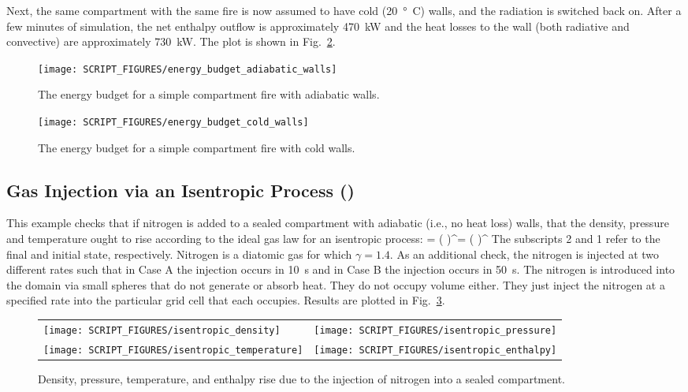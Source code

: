 \documentclass[11pt]{book}
\begin{document}
Next, the same compartment with the same fire is now assumed to have cold (20~\si{\degree C}) walls, and the radiation is switched back on. After a few minutes of simulation, the net enthalpy outflow is approximately 470~kW and the heat losses to the wall (both radiative and convective) are approximately 730~kW. The plot is shown in Fig.~\ref{energy_budget_cold_walls_fig}.

\begin{figure}[ht]
\centering
\texttt{[image: SCRIPT\_FIGURES/energy\_budget\_adiabatic\_walls]}
\caption[The {\ct energy\_budget\_adiabatic\_walls} test case]{The energy budget for a simple compartment fire with adiabatic walls.}
\label{energy_budget_adiabatic_walls_fig}
\end{figure}

\begin{figure}[ht]
\centering
\texttt{[image: SCRIPT\_FIGURES/energy\_budget\_cold\_walls]}
\caption[The {\ct energy\_budget\_cold\_walls} test case]{The energy budget for a simple compartment fire with cold walls.}
\label{energy_budget_cold_walls_fig}
\end{figure}


\subsection{Gas Injection via an Isentropic Process (\texorpdfstring{}{isentropic})}
\label{isentropic}

This example checks that if nitrogen is added to a sealed compartment with adiabatic (i.e., no heat loss) walls, that the density, pressure and temperature ought to rise according to the ideal gas law for an isentropic process: \be {} = \left(  \right)^\gamma = \left(  \right)^{}  \ee The subscripts 2 and 1 refer to the final and initial state, respectively. Nitrogen is a diatomic gas for which $\gamma=1.4$. As an additional check, the nitrogen is injected at two different rates such that in Case A the injection occurs in 10~s and in Case B the injection occurs in 50~s. The nitrogen is introduced into the domain via small spheres that do not generate or absorb heat. They do not occupy volume either. They just inject the nitrogen at a specified rate into the particular grid cell that each occupies.  Results are plotted in Fig.~\ref{isentropic_fig}.

\begin{figure}[ht]
\begin{tabular*}{\textwidth}{lr}
\texttt{[image: SCRIPT\_FIGURES/isentropic\_density]} &
\texttt{[image: SCRIPT\_FIGURES/isentropic\_pressure]} \\
\texttt{[image: SCRIPT\_FIGURES/isentropic\_temperature]} &
\texttt{[image: SCRIPT\_FIGURES/isentropic\_enthalpy]}
\end{tabular*}
\caption[The  test case]{Density, pressure, temperature, and enthalpy rise due to the injection of nitrogen into a sealed compartment.}
\label{isentropic_fig}
\end{figure}
\end{document}
